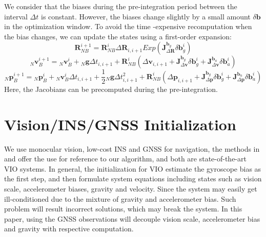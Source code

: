 \documentclass[journal,article,submit,moreauthors,pdftex]{Definitions/mdpi}
\begin{document}
We consider that the biases during the pre-integration period between the interval $\Delta{t}$ is constant. However, the biases change slightly  by a small amount $\delta\boldsymbol{b}$ in the optimization window. To avoid the time -expensive recomputation when the bias changes, we can update the states using a first-order expansion: 
\begin{equation}
	\boldsymbol{R}_{NB}^{i+1} = \boldsymbol{R}_{NB}^{i} \Delta{\boldsymbol{R}_{i,i+1}} Exp \left(\boldsymbol{J}_{\Delta\boldsymbol{R}}^{\boldsymbol{b}_g}\delta\boldsymbol{b}_g^i \right)
\end{equation}
\begin{equation}
	{_N}\boldsymbol{v}_{B}^{i+1} = {_N}\boldsymbol{v}_{B}^{i} + {_N}\boldsymbol{g}\Delta{t}_{i,i+1} + \boldsymbol{R}_{NB}^i(\Delta\boldsymbol{v}_{i,i+1}+\boldsymbol{J}_{\Delta\boldsymbol{v}}^{\boldsymbol{b}_g}\delta\boldsymbol{b}_g^i+\boldsymbol{J}_{\Delta\boldsymbol{v}}^{\boldsymbol{b}_a}\delta\boldsymbol{b}_a^i)
	\label{prein-vel}
\end{equation}
\begin{equation}
	{_N}\boldsymbol{p}_{B}^{i+1} = {_N}\boldsymbol{p}_{B}^{i} + {_N}\boldsymbol{v}_{B}^{i}\Delta{t}_{i,i+1} + \frac{1}{2}{_N}\boldsymbol{g}\Delta{t}_{i,i+1}^2 + \boldsymbol{R}_{NB}^i(\Delta\boldsymbol{p}_{i,i+1}+\boldsymbol{J}_{\Delta\boldsymbol{p}}^{\boldsymbol{b}_g}\delta\boldsymbol{b}_g^i+\boldsymbol{J}_{\Delta\boldsymbol{p}}^{\boldsymbol{b}_a}\delta\boldsymbol{b}_a^i)
	\label{prein-pos}
\end{equation}
Here, the Jacobians can be precomputed during the pre-integration.

\section{Vision/INS/GNSS Initialization}
We use monocular vision, low-cost INS and GNSS for navigation, the methods in \cite{qinRobustInitializationMonocular2017} and \cite{mur-artalVisualInertialMonocularSLAM2017a} offer the use for reference to our algorithm, and both are state-of-the-art VIO systems. In general, the initialization for VIO estimate the gyroscope bias as the first step, and then formulate system equations including states such as vision scale, accelerometer biases, gravity and velocity. Since the system may easily get ill-conditioned due to the mixture of gravity and accelerometer bias. Such problem will result incorrect solutions, which may break the system. In this paper, using the GNSS observations will decouple vision scale, accelerometer bias and gravity with respective computation. 
\end{document}

